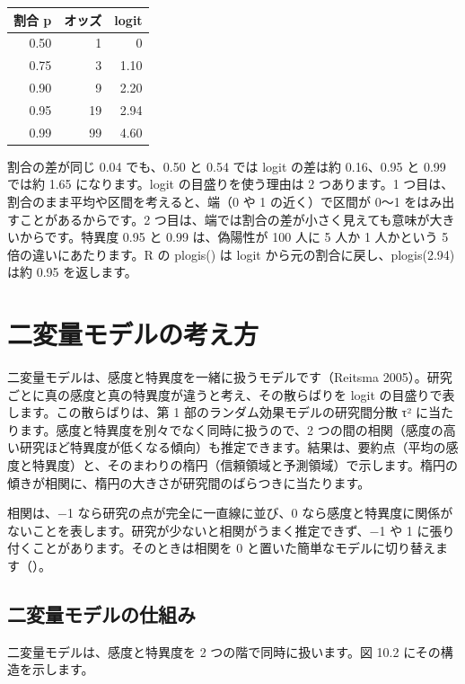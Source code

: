 \begin{kkcenter}
\begin{tabular}{rrr}
\toprule
割合 p & オッズ & logit \\
\midrule
0.50 & 1 & 0 \\
0.75 & 3 & 1.10 \\
0.90 & 9 & 2.20 \\
0.95 & 19 & 2.94 \\
0.99 & 99 & 4.60 \\
\bottomrule
\end{tabular}
\end{kkcenter}

割合の差が同じ 0.04 でも、0.50 と 0.54 では logit の差は約 0.16、0.95 と 0.99 では約 1.65 になります。logit の目盛りを使う理由は 2 つあります。1 つ目は、割合のまま平均や区間を考えると、端（0 や 1 の近く）で区間が 0〜1 をはみ出すことがあるからです。2 つ目は、端では割合の差が小さく見えても意味が大きいからです。特異度 0.95 と 0.99 は、偽陽性が 100 人に 5 人か 1 人かという 5 倍の違いにあたります。R の plogis() は logit から元の割合に戻し、plogis(2.94) は約 0.95 を返します。

\section{二変量モデルの考え方}
\label{sec:10-4}

二変量モデルは、感度と特異度を一緒に扱うモデルです（Reitsma 2005）。研究ごとに真の感度と真の特異度が違うと考え、その散らばりを logit の目盛りで表します。この散らばりは、第 1 部のランダム効果モデルの研究間分散 τ² に当たります。感度と特異度を別々でなく同時に扱うので、2 つの間の相関（感度の高い研究ほど特異度が低くなる傾向）も推定できます。結果は、要約点（平均の感度と特異度）と、そのまわりの楕円（信頼領域と予測領域）で示します。楕円の傾きが相関に、楕円の大きさが研究間のばらつきに当たります。

相関は、−1 なら研究の点が完全に一直線に並び、0 なら感度と特異度に関係がないことを表します。研究が少ないと相関がうまく推定できず、−1 や 1 に張り付くことがあります。そのときは相関を 0 と置いた簡単なモデルに切り替えます（）。

\subsection{\hatten 二変量モデルの仕組み}
\label{sec:10-4-1}

二変量モデルは、感度と特異度を 2 つの階で同時に扱います。図 10.2 にその構造を示します。

